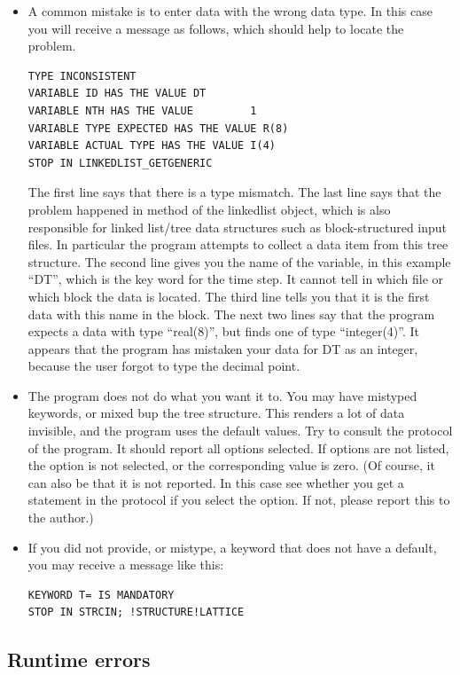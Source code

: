 \documentclass[final,12pt]{article}
\begin{document}
{{{{{{\begin{itemize}
\item A common mistake is to enter data with the wrong data type.
  In this case you will receive a message as follows, which should help
  to locate the problem.
\begin{verbatim}
TYPE INCONSISTENT
VARIABLE ID HAS THE VALUE DT
VARIABLE NTH HAS THE VALUE         1
VARIABLE TYPE EXPECTED HAS THE VALUE R(8)
VARIABLE ACTUAL TYPE HAS THE VALUE I(4)
STOP IN LINKEDLIST_GETGENERIC
\end{verbatim}
The first line says that there is a type mismatch. The last line
says that the problem happened in method of the linkedlist object,
which is also responsible for linked list/tree data structures such as
block-structured input files. In particular the program attempts to
collect a data item from this tree structure.  The second line gives
you the name of the variable, in this example ``DT'', which is the key
word for the time step. It cannot tell in which file or which block
the data is located. The third line tells you that it is the first
data with this name in the block. The next two lines say that the
program expects a data with type ``real(8)'', but finds one of type
``integer(4)''. It appears that the program has mistaken your data for
DT as an integer, because the user forgot to type the decimal point.
\item The program does not do what you want it to. You may have mistyped
  keywords, or mixed bup the tree structure. This renders a lot of data
  invisible, and the program uses the default values. Try to consult
  the protocol of the program. It should report all options selected.
  If options are not listed, the option is not selected, or the
  corresponding value is zero. (Of course, it can also be that it is
  not reported. In this case see whether you get a statement in the
  protocol if you select the option. If not, please report this to the
  author.)
\item If you did not provide, or mistype, a keyword that does not have
  a default, you may receive a message like this:
\begin{verbatim}
KEYWORD T= IS MANDATORY
STOP IN STRCIN; !STRUCTURE!LATTICE
\end{verbatim}

\end{itemize}



\subsection{Runtime errors}

}}}}}}
\end{document}
